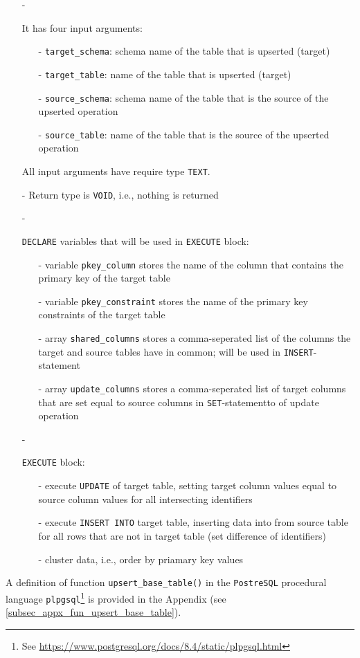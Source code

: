 \begin{itemize}
\item[-]{It has four input arguments:
  \begin{itemize}
  \item[-]{\texttt{target\_schema}: schema name of the table that is upserted (target)}
  \item[-]{\texttt{target\_table}: name of the table that is upserted (target)}
  \item[-]{\texttt{source\_schema}: schema name of the table that is the source of the upserted operation}
  \item[-]{\texttt{source\_table}: name of the table that is the source of the upserted operation}
  \end{itemize}
All input arguments have require type \texttt{TEXT}.
}
\item[-]{Return type is \texttt{VOID}, i.e., nothing is returned}
\item[-]{\texttt{DECLARE} variables that will be used in \texttt{EXECUTE} block:%
\begin{itemize}
  \item[-]{variable \texttt{pkey\_column} stores the name of the column that contains the primary key of the target table}%
  \item[-]{variable \texttt{pkey\_constraint} stores the name of the primary key constraints of the target table}%
  \item[-]{array \texttt{shared\_columns} stores a comma-seperated list of the columns the target and source tables have in common; will be used in \texttt{INSERT}-statement%
  }%
  \item[-]{array \texttt{update\_columns} stores a comma-seperated list of target columns that are set equal to source columns in \texttt{SET}-statementto of update operation%
  }%
\end{itemize}
}%
\item[-]{\texttt{EXECUTE} block:%
\begin{itemize}
    \item[-]{execute \texttt{UPDATE} of target table, setting target column values equal to source column values for all intersecting identifiers%
    }%
    \item[-]{execute \texttt{INSERT INTO} target table, inserting data into from source table for all rows that are not in target table (set difference of identifiers)}%
    \item[-]{cluster data, i.e., order by priamary key values}%
\end{itemize}
}
\end{itemize}
A definition of function \texttt{upsert\_base\_table()} in the \texttt{PostreSQL} procedural language \texttt{plpgsql}\footnote{See \url{https://www.postgresql.org/docs/8.4/static/plpgsql.html}} is provided in the Appendix (see \ref{subsec_appx_fun_upsert_base_table}).


